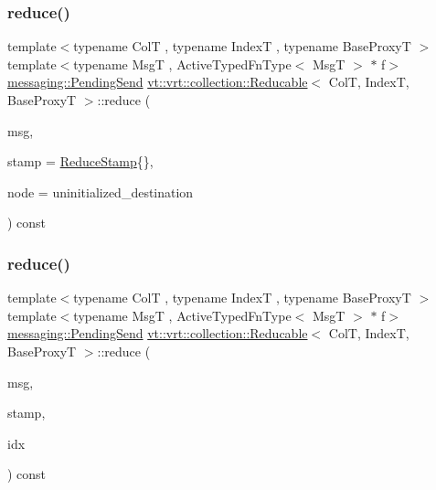 \subsubsection{\texorpdfstring{reduce()}{reduce()}\hspace{0.1cm}{\footnotesize\ttfamily [5/6]}}
{\footnotesize\ttfamily template$<$typename ColT , typename IndexT , typename Base\+ProxyT $>$ \\
template$<$typename MsgT , Active\+Typed\+Fn\+Type$<$ Msg\+T $>$ $\ast$ f$>$ \\
\hyperlink{structvt_1_1messaging_1_1_pending_send}{messaging\+::\+Pending\+Send} \hyperlink{structvt_1_1vrt_1_1collection_1_1_reducable}{vt\+::vrt\+::collection\+::\+Reducable}$<$ ColT, IndexT, Base\+ProxyT $>$\+::reduce (\begin{DoxyParamCaption}\item[{MsgT $\ast$const}]{msg,  }\item[{\hyperlink{structvt_1_1vrt_1_1collection_1_1_reducable_a19f80baf23f36dad4948ef07322fd0cb}{Reduce\+Stamp}}]{stamp = {\ttfamily \hyperlink{structvt_1_1vrt_1_1collection_1_1_reducable_a19f80baf23f36dad4948ef07322fd0cb}{Reduce\+Stamp}\{\}},  }\item[{\hyperlink{namespacevt_a866da9d0efc19c0a1ce79e9e492f47e2}{Node\+Type} const \&}]{node = {\ttfamily uninitialized\+\_\+destination} }\end{DoxyParamCaption}) const}

\mbox{\label{structvt_1_1vrt_1_1collection_1_1_reducable_a9a8ad5efbc4314a9658d3bae4f881010}} 
\subsubsection{\texorpdfstring{reduce()}{reduce()}\hspace{0.1cm}{\footnotesize\ttfamily [6/6]}}
{\footnotesize\ttfamily template$<$typename ColT , typename IndexT , typename Base\+ProxyT $>$ \\
template$<$typename MsgT , Active\+Typed\+Fn\+Type$<$ Msg\+T $>$ $\ast$ f$>$ \\
\hyperlink{structvt_1_1messaging_1_1_pending_send}{messaging\+::\+Pending\+Send} \hyperlink{structvt_1_1vrt_1_1collection_1_1_reducable}{vt\+::vrt\+::collection\+::\+Reducable}$<$ ColT, IndexT, Base\+ProxyT $>$\+::reduce (\begin{DoxyParamCaption}\item[{MsgT $\ast$const}]{msg,  }\item[{\hyperlink{structvt_1_1vrt_1_1collection_1_1_reducable_a19f80baf23f36dad4948ef07322fd0cb}{Reduce\+Stamp}}]{stamp,  }\item[{IndexT const \&}]{idx }\end{DoxyParamCaption}) const}

